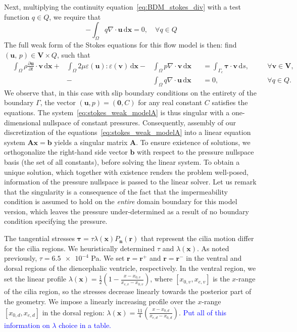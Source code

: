 \documentclass[fleqn]{wlscirep}
\newcommand{\pdifft}[1]{\frac{\partial  #1}{\partial t}}
\newcommand{\intO}[1]{\int_{\Omega}#1 \, \mathrm d\bm{x}}
\newcommand{\intGc}[1]{\int_{\Gamma_c}#1 \, \mathrm ds}
\newcommand{\nn}{\mathbf{n}}
\newcommand{\rr}{\mathbf{r}}
\newcommand{\uu}{\mathbf{u}}
\newcommand{\vv}{\mathbf{v}}
\newcommand{\xx}{\bm{x}}
\newcommand{\VV}{\mathbf{V}}
\newcommand{\btau}{\bm{\tau}}
\newcommand{\lyng}[1]{\textcolor{blue}{#1}}
\begin{document}
Next, multiplying the continuity equation~\eqref{eq:BDM_stokes_div}
with a test function $q\in Q$, we require that
\begin{equation}
    -\intO{q\nabla\cdot\uu} = 0,\quad\forall q\in Q
    \label{eq:pressure_weak_form}
\end{equation}
The full weak form of the Stokes equations for this flow model is then:
find $(\uu, \, p) \in \VV\times Q$, such that
\begin{subequations}
    \begin{alignat}{5}
        &\intO{\rho\pdifft{\uu}\cdot\vv}
        + &\intO{2\mu\varepsilon(\uu) : \varepsilon(\vv)}
        - &\intO{p\nabla\cdot\vv}
        &&= \intGc{\btau\cdot\vv}, &&\quad\forall\vv\in\VV, \label{eq:stokes_weak_mom_modelA}\\ 
        &{} &{}  -&\intO{q\nabla\cdot\uu} &&= 0, &&\quad\forall q\in Q. \label{eq:stokes_weak_cont_modelA}
    \end{alignat}%
    \label{eq:stokes_weak_modelA}%
\end{subequations}%
We observe that, in this case with slip boundary conditions on the entirety of the boundary $\Gamma$, the
vector $(\uu, p)=(\mathbf{0}, C)$ for any real constant $C$ satisfies the equations.
The system~\eqref{eq:stokes_weak_modelA} is thus singular with a one-dimensional nullspace of constant pressures.
Consequently, assembly of our discretization of the  equations~\eqref{eq:stokes_weak_modelA} into a
linear equation system $\mathbf{A}\xx=\mathbf{b}$ yields a singular matrix $\mathbf{A}$.
To ensure existence of solutions, we orthogonalize the right-hand side vector $\mathbf{b}$ with
respect to the pressure nullspace basis (the set of all constants), before solving the linear system.
To obtain a unique solution, which together with existence renders the problem well-posed,
information of the pressure nullspace is passed to the linear solver. Let us remark that
the singularity is a consequence of the fact that the impermeability condition is assumed
to hold on the \emph{entire} domain boundary for this model version, which leaves the
pressure under-determined as a result of no boundary condition specifying the pressure.

The tangential stresses $\btau = \tau\lambda(\xx) P_{\nn}(\rr)$ that represent the cilia
motion differ for the cilia regions. We heuristically determined $\tau$ and $\lambda(\xx)$.
As noted previously, $\tau=\num{6.5e-4}$ Pa. We set $\rr = \rr^+$ and $\rr = \rr^-$ in
the ventral and dorsal regions of the diencephalic ventricle, respectively. In the ventral region,
we set the linear profile $\lambda(\xx) = \frac{1}{2}\left(1 - \frac{x-x_{0, v}}{x_{e, v} - x_{0, v}}\right)$,
where $[x_{0, v}, x_{e, v}]$ is the $x$-range of the cilia region, so the stresses decrease
linearly towards the posterior part of the geometry. We impose a linearly increasing profile
over the $x$-range $[x_{0, d}, x_{e, d}]$ in the dorsal region:
$\lambda(\xx)=\frac{11}{4}\left(\frac{x-x_{0, d}}{x_{e, d} - x_{0, d}}\right)$.
\lyng{Put all of this information on $\lambda$ choice in a table.}
\end{document}
